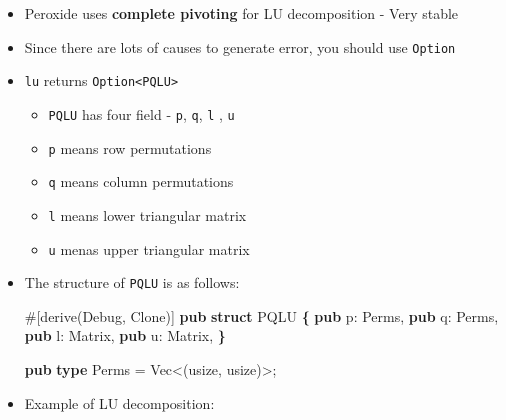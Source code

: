 \documentclass[]{book}
\newenvironment{Shaded}{\begin{snugshade}}{\end{snugshade}}
\newcommand{\AttributeTok}[1]{\textcolor[rgb]{0.77,0.63,0.00}{#1}}
\newcommand{\BuiltInTok}[1]{#1}
\newcommand{\DataTypeTok}[1]{\textcolor[rgb]{0.13,0.29,0.53}{#1}}
\newcommand{\KeywordTok}[1]{\textcolor[rgb]{0.13,0.29,0.53}{\textbf{#1}}}
\newcommand{\NormalTok}[1]{#1}
\newcommand{\OperatorTok}[1]{\textcolor[rgb]{0.81,0.36,0.00}{\textbf{#1}}}
\providecommand{\tightlist}{%
  \setlength{\itemsep}{0pt}\setlength{\parskip}{0pt}}
\begin{document}
\begin{itemize}
\item
  Peroxide uses \textbf{complete pivoting} for LU decomposition - Very stable
\item
  Since there are lots of causes to generate error, you should use \texttt{Option}
\item
  \texttt{lu} returns \texttt{Option\textless{}PQLU\textgreater{}}

  \begin{itemize}
  \tightlist
  \item
    \texttt{PQLU} has four field - \texttt{p}, \texttt{q}, \texttt{l} , \texttt{u}
  \item
    \texttt{p} means row permutations
  \item
    \texttt{q} means column permutations
  \item
    \texttt{l} means lower triangular matrix
  \item
    \texttt{u} menas upper triangular matrix
  \end{itemize}
\item
  The structure of \texttt{PQLU} is as follows:

\begin{Shaded}
\begin{Highlighting}[]
\AttributeTok{#[}\NormalTok{derive}\AttributeTok{(}\BuiltInTok{Debug}\AttributeTok{,} \BuiltInTok{Clone}\AttributeTok{)]}
\KeywordTok{pub} \KeywordTok{struct}\NormalTok{ PQLU }\OperatorTok{\{}
    \KeywordTok{pub}\NormalTok{ p: Perms,}
    \KeywordTok{pub}\NormalTok{ q: Perms,}
    \KeywordTok{pub}\NormalTok{ l: Matrix,}
    \KeywordTok{pub}\NormalTok{ u: Matrix,}
\OperatorTok{\}}

\KeywordTok{pub} \KeywordTok{type}\NormalTok{ Perms = }\DataTypeTok{Vec}\NormalTok{<(}\DataTypeTok{usize}\NormalTok{, }\DataTypeTok{usize}\NormalTok{)>;}
\end{Highlighting}
\end{Shaded}
\item
  Example of LU decomposition:


\end{itemize}
\end{document}
